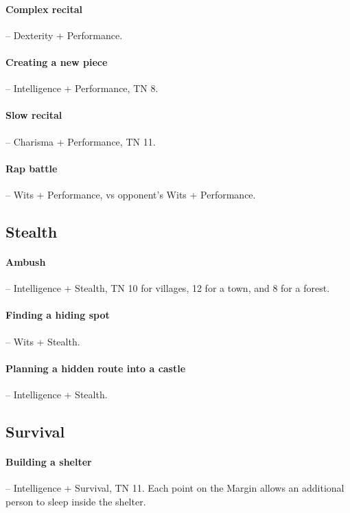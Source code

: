 \begin{multicols}{2}
\paragraph{Complex recital} -- Dexterity + Performance.

\paragraph{Creating a new piece} -- Intelligence + Performance, TN 8.

\paragraph{Slow recital} -- Charisma + Performance, TN 11.

\paragraph{Rap battle} -- Wits + Performance, vs opponent's Wits + Performance.

\subsection{Stealth}

\paragraph{Ambush} -- Intelligence + Stealth, TN 10 for villages, 12 for a town, and 8 for a forest.

\paragraph{Finding a hiding spot} -- Wits + Stealth.

\paragraph{Planning a hidden route into a castle} -- Intelligence + Stealth.

\subsection{Survival}

\paragraph{Building a shelter} -- Intelligence + Survival, TN 11.
Each point on the Margin allows an additional person to sleep inside the shelter.


\end{multicols}

